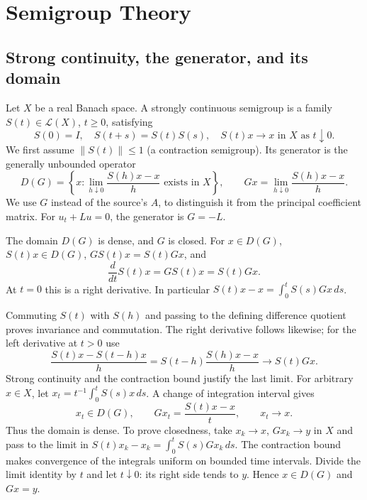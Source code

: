 \Needspace{55mm}
\section{Semigroup Theory}
\label{sec:7-4}
\Needspace{55mm}
\subsection{Strong continuity, the generator, and its domain}
Let $X$ be a real Banach space. A strongly continuous semigroup is a family
$S(t)\in\mathcal L(X)$, $t\geq0$, satisfying
\[
 S(0)=I,\quad S(t+s)=S(t)S(s),\quad S(t)x\longrightarrow x
 \text{ in }X\text{ as }t\downarrow0.
\]
We first assume $\|S(t)\|\leq1$ (a contraction semigroup).
Its generator is the generally unbounded operator
\[
 D(G)=\left\{x:\lim_{h\downarrow0}\frac{S(h)x-x}{h}
          \text{ exists in }X\right\},\qquad
 Gx=\lim_{h\downarrow0}\frac{S(h)x-x}{h}.
\]
We use $G$ instead of the source's $A$, to distinguish it from the principal
coefficient matrix. For $u_t+Lu=0$, the generator is $G=-L$.
\Needspace{55mm}

\Needspace{55mm}
\begin{theorem}
\label{thm:7-generator}
The domain $D(G)$ is dense, and $G$ is closed. For $x\in D(G)$,
$S(t)x\in D(G)$, $GS(t)x=S(t)Gx$, and
\[
 \frac d{dt}S(t)x=GS(t)x=S(t)Gx.
\]
At $t=0$ this is a right derivative. In particular
$S(t)x-x=\int_0^tS(s)Gx\,ds$.
\end{theorem}
\begin{expandedproof}
Commuting $S(t)$ with $S(h)$ and passing to the defining difference quotient
proves invariance and commutation. The right derivative follows likewise;
for the left derivative at $t>0$ use
\[
 \frac{S(t)x-S(t-h)x}{h}=S(t-h)\frac{S(h)x-x}{h}
 \longrightarrow S(t)Gx.
\]
Strong continuity and the contraction bound justify the last limit.
For arbitrary $x\in X$, let $x_t=t^{-1}\int_0^tS(s)x\,ds$.
A change of integration interval gives
\[
 x_t\in D(G),\qquad Gx_t=\frac{S(t)x-x}{t},\qquad x_t\to x.
\]
Thus the domain is dense. To prove closedness, take $x_k\to x$,
$Gx_k\to y$ in $X$ and pass to the limit in
$S(t)x_k-x_k=\int_0^tS(s)Gx_k\,ds$.
The contraction bound makes convergence of the integrals uniform on
bounded time intervals. Divide the limit identity by $t$ and let
$t\downarrow0$: its right side tends to $y$. Hence $x\in D(G)$ and $Gx=y$.
\end{expandedproof}
\Needspace{55mm}

